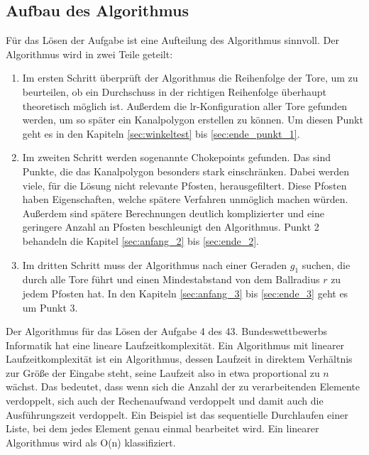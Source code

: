 \subsection{Aufbau des Algorithmus}
Für das Lösen der Aufgabe ist eine Aufteilung des Algorithmus sinnvoll. 
Der Algorithmus wird in zwei Teile geteilt:
\begin{enumerate}
    \item Im ersten Schritt überprüft der Algorithmus die Reihenfolge der Tore, um zu beurteilen, ob ein Durchschuss in der richtigen Reihenfolge überhaupt theoretisch möglich ist. Außerdem die lr-Konfiguration aller Tore gefunden werden, um so später ein Kanalpolygon erstellen zu können. Um diesen Punkt geht es in den Kapiteln \ref{sec:winkeltest} bis \ref{sec:ende_punkt_1}.

    \item Im zweiten Schritt werden sogenannte Chokepoints gefunden. Das sind Punkte, die das Kanalpolygon besonders stark einschränken. Dabei werden viele, für die Lösung nicht relevante Pfosten, herausgefiltert. Diese Pfosten haben Eigenschaften, welche spätere Verfahren unmöglich machen würden. Außerdem sind spätere Berechnungen deutlich komplizierter und eine geringere Anzahl an Pfosten beschleunigt den Algorithmus. Punkt 2 behandeln die Kapitel \ref{sec:anfang_2} bis \ref{sec:ende_2}.

    \item Im dritten Schritt muss der Algorithmus nach einer Geraden $g_1$ suchen, die durch alle Tore führt und einen Mindestabstand von dem Ballradius $r$ zu jedem Pfosten hat. In den Kapiteln \ref{sec:anfang_3} bis \ref{sec:ende_3} geht es um Punkt 3.


\end{enumerate}


Der Algorithmus für das Lösen der Aufgabe 4 des 43. Bundeswettbewerbs Informatik hat eine lineare Laufzeitkomplexität.
Ein Algorithmus mit linearer Laufzeitkomplexität ist ein Algorithmus, dessen Laufzeit in direktem Verhältnis zur Größe der Eingabe steht, seine Laufzeit also in etwa proportional zu \(n\) wächst. Das bedeutet, dass wenn sich die Anzahl der zu verarbeitenden Elemente verdoppelt, sich auch der Rechenaufwand verdoppelt und damit auch die Ausführungszeit verdoppelt. Ein Beispiel ist das sequentielle Durchlaufen einer Liste, bei dem jedes Element genau einmal bearbeitet wird. Ein linearer Algorithmus wird als O(n) klassifiziert. \cite{Cormen2009}

